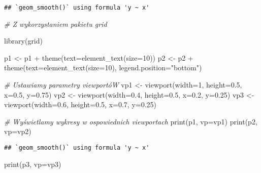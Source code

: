 \documentclass[
]{book}
\newenvironment{Shaded}{\begin{snugshade}}{\end{snugshade}}
\newcommand{\AttributeTok}[1]{\textcolor[rgb]{0.77,0.63,0.00}{#1}}
\newcommand{\CommentTok}[1]{\textcolor[rgb]{0.56,0.35,0.01}{\textit{#1}}}
\newcommand{\DecValTok}[1]{\textcolor[rgb]{0.00,0.00,0.81}{#1}}
\newcommand{\FloatTok}[1]{\textcolor[rgb]{0.00,0.00,0.81}{#1}}
\newcommand{\FunctionTok}[1]{\textcolor[rgb]{0.00,0.00,0.00}{#1}}
\newcommand{\NormalTok}[1]{#1}
\newcommand{\OtherTok}[1]{\textcolor[rgb]{0.56,0.35,0.01}{#1}}
\newcommand{\SpecialCharTok}[1]{\textcolor[rgb]{0.00,0.00,0.00}{#1}}
\newcommand{\StringTok}[1]{\textcolor[rgb]{0.31,0.60,0.02}{#1}}
\begin{document}
\begin{verbatim}
## `geom_smooth()` using formula 'y ~ x'
\end{verbatim}

\begin{Shaded}
\begin{Highlighting}[]
\CommentTok{\# Z wykorzystaniem pakietu grid}

\FunctionTok{library}\NormalTok{(grid)}

\NormalTok{p1 }\OtherTok{\textless{}{-}}\NormalTok{ p1 }\SpecialCharTok{+} \FunctionTok{theme}\NormalTok{(}\AttributeTok{text=}\FunctionTok{element\_text}\NormalTok{(}\AttributeTok{size=}\DecValTok{10}\NormalTok{))}
\NormalTok{p2 }\OtherTok{\textless{}{-}}\NormalTok{ p2 }\SpecialCharTok{+} \FunctionTok{theme}\NormalTok{(}\AttributeTok{text=}\FunctionTok{element\_text}\NormalTok{(}\AttributeTok{size=}\DecValTok{10}\NormalTok{), }\AttributeTok{legend.position=}\StringTok{"bottom"}\NormalTok{)}

\CommentTok{\# Ustawiamy parametry viewportóW}
\NormalTok{vp1 }\OtherTok{\textless{}{-}} \FunctionTok{viewport}\NormalTok{(}\AttributeTok{width=}\DecValTok{1}\NormalTok{, }\AttributeTok{height=}\FloatTok{0.5}\NormalTok{, }\AttributeTok{x=}\FloatTok{0.5}\NormalTok{, }\AttributeTok{y=}\FloatTok{0.75}\NormalTok{)}
\NormalTok{vp2 }\OtherTok{\textless{}{-}} \FunctionTok{viewport}\NormalTok{(}\AttributeTok{width=}\FloatTok{0.4}\NormalTok{, }\AttributeTok{height=}\FloatTok{0.5}\NormalTok{, }\AttributeTok{x=}\FloatTok{0.2}\NormalTok{, }\AttributeTok{y=}\FloatTok{0.25}\NormalTok{)}
\NormalTok{vp3 }\OtherTok{\textless{}{-}} \FunctionTok{viewport}\NormalTok{(}\AttributeTok{width=}\FloatTok{0.6}\NormalTok{, }\AttributeTok{height=}\FloatTok{0.5}\NormalTok{, }\AttributeTok{x=}\FloatTok{0.7}\NormalTok{, }\AttributeTok{y=}\FloatTok{0.25}\NormalTok{)}

\CommentTok{\# Wyświetlamy wykresy w ospowiednich viewportach}
\FunctionTok{print}\NormalTok{(p1, }\AttributeTok{vp=}\NormalTok{vp1)}
\FunctionTok{print}\NormalTok{(p2, }\AttributeTok{vp=}\NormalTok{vp2)}
\end{Highlighting}
\end{Shaded}

\begin{verbatim}
## `geom_smooth()` using formula 'y ~ x'
\end{verbatim}

\begin{Shaded}
\begin{Highlighting}[]
\FunctionTok{print}\NormalTok{(p3, }\AttributeTok{vp=}\NormalTok{vp3)}
\end{Highlighting}
\end{Shaded}
\end{document}
